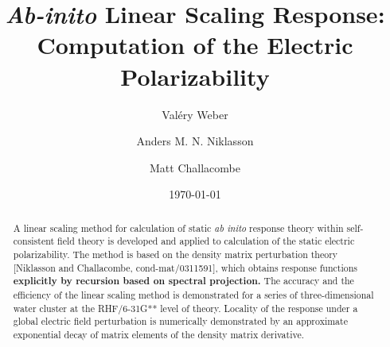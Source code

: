 \documentclass[prl,aps,twocolumn,showpacs,twocolumngrid,superbib]{revtex4}
\begin{document}
\title{\emph{Ab-inito} Linear Scaling Response: \\ Computation of the Electric Polarizability}

\author{Val\'ery Weber}
\author{Anders M. N. Niklasson}
\author{Matt Challacombe}

\date{\today}

\begin{abstract}
A linear scaling method for calculation of static {\em ab inito} response theory
 within self-consistent field theory 
is developed and applied to calculation of the static electric polarizability. 
 The method is based on the density matrix 
perturbation theory [Niklasson and Challacombe, cond-mat/0311591], which obtains
 response functions
 {\bf explicitly by recursion based on spectral projection.}
 The accuracy and the efficiency of
 the linear scaling method is demonstrated 
for a series of three-dimensional water cluster at the RHF/6-31G** level of theory.
  Locality of the response 
under a global electric field perturbation is numerically demonstrated by an approximate exponential decay of
matrix elements of the density matrix derivative.
\end{abstract}

\maketitle

\end{document}
